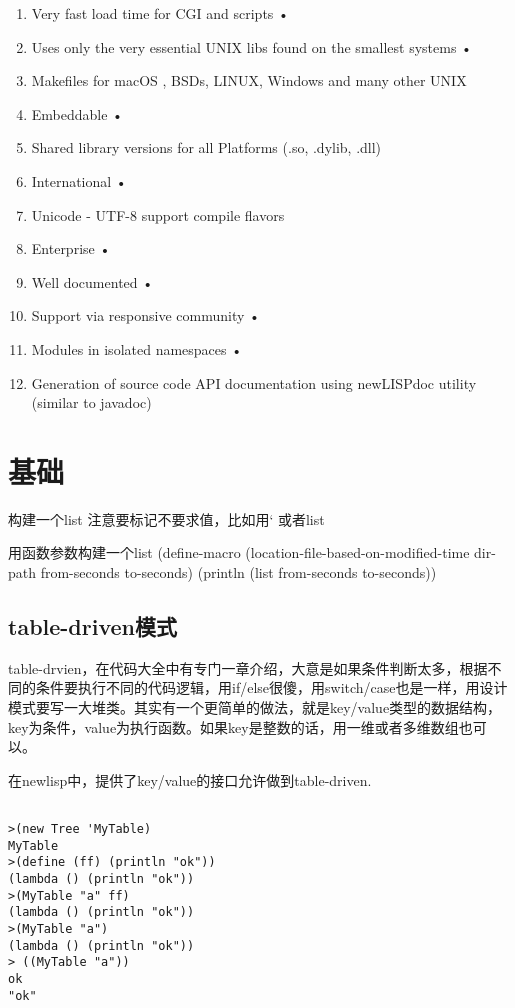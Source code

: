 \documentclass[cn,11pt]{elegantbook}
\begin{document}
\begin{enumerate}
  • \item Very fast load time for CGI and scripts 
  • \item Uses only the very essential UNIX libs found on the smallest systems 
  • \item Makefiles for macOS , BSDs, LINUX, Windows and many other UNIX 
  \item Embeddable
  • \item Shared library versions for all Platforms (.so, .dylib, .dll) 
  \item International
  • \item Unicode - UTF-8 support compile flavors 
  \item Enterprise
  • \item Well documented 
  • \item Support via responsive community 
  • \item Modules in isolated namespaces 
  • \item Generation of source code API documentation using newLISPdoc utility (similar to javadoc) 
\end{enumerate}


\section{基础}

构建一个list
注意要标记不要求值，比如用‘ 或者list

用函数参数构建一个list
(define-macro (location-file-based-on-modified-time dir-path from-seconds to-seconds)
(println (list from-seconds to-seconds))

\subsection{table-driven模式}
table-drvien，在代码大全中有专门一章介绍，大意是如果条件判断太多，根据不同的条件要执行不同的代码逻辑，用if/else很傻，用switch/case也是一样，用设计模式要写一大堆类。其实有一个更简单的做法，就是key/value类型的数据结构，key为条件，value为执行函数。如果key是整数的话，用一维或者多维数组也可以。

在newlisp中，提供了key/value的接口允许做到table-driven.

\begin{lstlisting}[language=shell,numbers=none,nolol]
  
>(new Tree 'MyTable)
MyTable
>(define (ff) (println "ok"))
(lambda () (println "ok"))
>(MyTable "a" ff)
(lambda () (println "ok"))
>(MyTable "a")
(lambda () (println "ok"))
> ((MyTable "a"))
ok
"ok"
\end{lstlisting}
\end{document}

